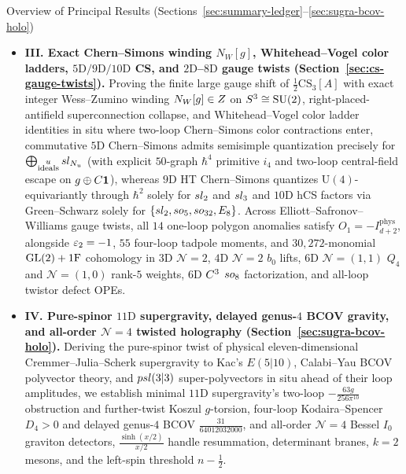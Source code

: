 \begin{summaryblock}{Overview of Principal Results (Sections~\ref{sec:summary-ledger}--\ref{sec:sugra-bcov-holo})}
\begin{itemize}[leftmargin=*]
  \item \textbf{III. Exact Chern--Simons winding $N_W[g]$, Whitehead--Vogel color ladders, $5\mathrm{D}/9\mathrm{D}/10\mathrm{D}$ CS, and $2\mathrm{D}$--$8\mathrm{D}$ gauge twists (Section~\ref{sec:cs-gauge-twists}).} Proving the finite large gauge shift of $\frac{1}{2}\mathrm{CS}_3[A]$ with exact integer Wess--Zumino winding $N_W[g] \in Z$ on $S^3 \cong \operatorname{SU}(2)$, right-placed-antifield superconnection collapse, and Whitehead--Vogel color ladder identities in situ where two-loop Chern--Simons color contractions enter, commutative $5\mathrm{D}$ Chern--Simons admits semisimple quantization precisely for $\bigoplus_{\substack{u\\\mathrm{ideals}}}sl_{N_u}$ (with explicit $50$-graph $\hbar^4$ primitive $i_4$ and two-loop central-field escape on $g\oplus C\mathbf{1}$), whereas $9\mathrm{D}$ HT Chern--Simons quantizes $\mathrm{U}(4)$-equivariantly through $\hbar^2$ solely for $sl_2$ and $sl_3$ and $10\mathrm{D}$ hCS factors via Green--Schwarz solely for $\{sl_2,so_5,so_{32},E_8\}$. Across Elliott--Safronov--Williams gauge twists, all $14$ one-loop polygon anomalies satisfy $O_1 = -I^{\mathrm{phys}}_{d+2}$, alongside $\varepsilon_2 = -1$, $55$ four-loop tadpole moments, and $30{,}272$-monomial $\operatorname{GL}(2)+1\mathrm{F}$ cohomology in $3\mathrm{D}$ $\mathcal{N}=2$, $4\mathrm{D}$ $\mathcal{N}=2$ $b_0$ lifts, $6\mathrm{D}$ $\mathcal{N}=(1,1)$ $Q_4$ and $\mathcal{N}=(1,0)$ rank-$5$ weights, $6\mathrm{D}$ $C^3$ $so_8$ factorization, and all-loop twistor defect OPEs.
  \item \textbf{IV. Pure-spinor $11\mathrm{D}$ supergravity, delayed genus-$4$ BCOV gravity, and all-order $\mathcal{N}=4$ twisted holography (Section~\ref{sec:sugra-bcov-holo}).} Deriving the pure-spinor twist of physical eleven-dimensional Cremmer--Julia--Scherk supergravity to Kac's $E(5|10)$, Calabi--Yau BCOV polyvector theory, and $psl(3|3)$ super-polyvectors in situ ahead of their loop amplitudes, we establish minimal $11\mathrm{D}$ supergravity's two-loop $-\frac{63g}{256\pi^{10}}$ obstruction and further-twist Koszul $g$-torsion, four-loop Kodaira--Spencer $D_4 > 0$ and delayed genus-$4$ BCOV $\frac{31}{64012032000}$, and all-order $\mathcal{N}=4$ Bessel $I_0$ graviton detectors, $\frac{\sinh(x/2)}{x/2}$ handle resummation, determinant branes, $k=2$ mesons, and the left-spin threshold $n - \frac{1}{2}$.
\end{itemize}
\end{summaryblock}

